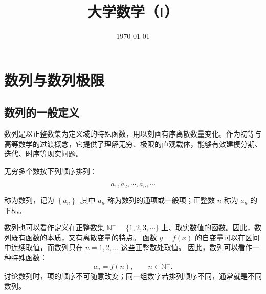 \documentclass[fontset=fandol]{ctexart}
\title{大学数学（$ \mathrm{I} $）}
\author{}
\date{\today}
\begin{document}
\maketitle
\vspace{-1em}


\section{数列与数列极限}



\subsection{数列的一般定义}

数列是以正整数集为定义域的特殊函数，用以刻画有序离散数量变化。作为初等与高等数学的过渡概念，它提供了理解无穷、极限的直观载体，能够有效建模分期、迭代、时序等现实问题。




\begin{definition}[数列]
无穷多个数按下列顺序排列：

$$
a_1, a_2, \cdots, a_n, \cdots
$$

称为数列，记为 $\left\{a_n\right\}$ ,其中 $a_n$ 称为数列的通项或一般项；正整数 $n$ 称为 $a_n$ 的下标。

数列也可以看作定义在正整数集 $\mathbb{N}^+=\{1,2,3,\cdots\}$ 上、取实数值的函数。因此，数列既有函数的本质，又有离散变量的特点。 函数 $y=f(x)$ 的自变量可以在区间中连续取值，而数列只在 $n=1,2,\ldots$ 这些正整数处取值。 因此，数列可以看作一种特殊函数：
\[
a_n=f(n),\qquad n\in\mathbb{N}^+.
\]
讨论数列时，项的顺序不可随意改变；同一组数字若排列顺序不同，通常就是不同数列。
\end{definition}
\end{document}
